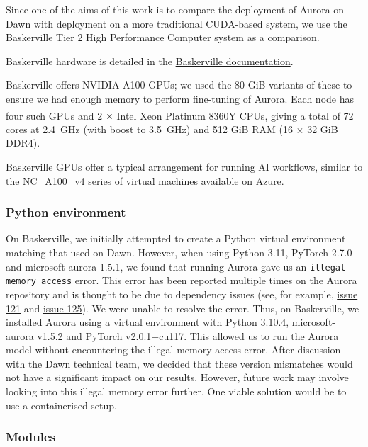 Since one of the aims of this work is to compare the deployment of Aurora on Dawn with deployment on a more traditional CUDA-based system, we use the Baskerville Tier 2 High Performance Computer system as a comparison.

Baskerville hardware is detailed in the \href{https://docs.baskerville.ac.uk/system/}{Baskerville documentation}.

Baskerville offers NVIDIA A100 GPUs; we used the 80 GiB variants of these to ensure we had enough memory to perform fine-tuning of Aurora. Each node has four such GPUs and 2 $\times$ Intel\textsuperscript{\tiny\textregistered} Xeon\textsuperscript{\tiny\textregistered} Platinum 8360Y CPUs, giving a total of 72 cores at \qty{2.4}{\giga\hertz} (with boost to \qty{3.5}{\giga\hertz}) and 512 GiB RAM (16 $\times$ 32 GiB DDR4).

Baskerville GPUs offer a typical arrangement for running AI workflows, similar to the \href{https://learn.microsoft.com/en-us/azure/virtual-machines/sizes/gpu-accelerated/nca100v4-series}{NC\_A100\_v4 series} of virtual machines available on Azure.

\subsubsection{Python environment}

On Baskerville, we initially attempted to create a Python virtual environment matching that used on Dawn. However, when using Python 3.11, PyTorch 2.7.0 and microsoft-aurora 1.5.1, we found that running Aurora gave us an {\tt illegal memory access} error. This error has been reported multiple times on the Aurora repository and is thought to be due to dependency issues (see, for example, \href{https://github.com/microsoft/aurora/issues/121}{issue 121} and \href{https://github.com/microsoft/aurora/issues/125}{issue 125}). We were unable to resolve the error. Thus, on Baskerville, we installed Aurora using a virtual environment with Python 3.10.4, microsoft-aurora v1.5.2 and PyTorch v2.0.1+cu117. This allowed us to run the Aurora model without encountering the illegal memory access error. After discussion with the Dawn technical team, we decided that these version mismatches would not have a significant impact on our results. However, future work may involve looking into this illegal memory error further. One viable solution would be to use a containerised setup.

\subsubsection{Modules}

